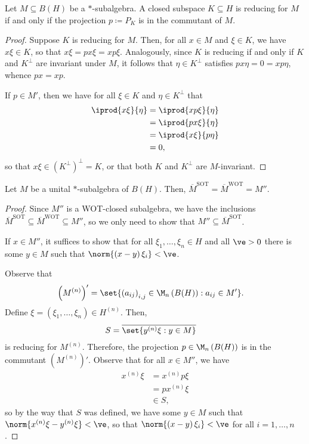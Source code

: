\documentclass[10pt]{mypackage}
\renewcommand{\coloneq}{\coloneqq}
\begin{document}
\begin{theorem}
  Let $M\subseteq B(H)$ be a $\ast$-subalgebra. A closed subspace $K\subseteq H$ is reducing for $M$ if and only if the projection $p\coloneq P_K$ is in the commutant of $M$.
\end{theorem}
\begin{proof}
  Suppose $K$ is reducing for $M$. Then, for all $x\in M$ and $\xi\in K$, we have $x\xi\in K$, so that $x\xi = px\xi = xp\xi$. Analogously, since $K$ is reducing if and only if $K$ and $K^{\perp}$ are invariant under $M$, it follows that $\eta\in K^{\perp}$ satisfies $px\eta = 0 = xp\eta$, whence $px = xp$.

  If $p\in M'$, then we have for all $\xi\in K$ and $\eta\in K^{\perp}$ that
  \begin{align*}
    \iprod{x\xi}{\eta} &= \iprod{xp\xi}{\eta}\\
                       &= \iprod{px\xi}{\eta}\\
                       &= \iprod{x\xi}{p\eta}\\
                       &= 0,
  \end{align*}
  so that $x\xi\in \left( K^{\perp} \right)^{\perp} = K$, or that both $K$ and $K^{\perp}$ are $M$-invariant.
\end{proof}
\begin{theorem}
  Let $M$ be a unital $\ast$-subalgebra of $B(H)$. Then, $ \overline{M}^{\operatorname{SOT}} = \overline{M}^{\operatorname{WOT}} = M'' $.
\end{theorem}
\begin{proof}
  Since $M''$ is a WOT-closed subalgebra, we have the inclusions $ \overline{M}^{\operatorname{SOT}}\subseteq \overline{M}^{\operatorname{WOT}}\subseteq M'' $, so we only need to show that $M''\subseteq \overline{M}^{\operatorname{SOT}}$.

  If $x\in M''$, it suffices to show that for all $\xi_1,\dots,\xi_n\in H$ and all $\ve > 0$ there is some $y\in M$ such that $\norm{\left( x-y \right)\xi_i} < \ve$.

  Observe that
  \begin{align*}
    \left( M^{(n)} \right)' &= \set{\left( a_{ij} \right)_{i,j}\in \M_n\left( B(H) \right) : a_{ij}\in M'}.
  \end{align*}
  Define $\xi = \left( \xi_1,\dots,\xi_n \right)\in H^{(n)}$. Then,
  \begin{align*}
    S &= \overline{\set{y^{(n)}\xi : y\in M}}
  \end{align*}
  is reducing for $M^{(n)}$. Therefore, the projection $p\in \M_n\left( B(H) \right)$ is in the commutant $\left( M^{(n)} \right)'$. Observe that for all $x\in M''$, we have
  \begin{align*}
    x^{(n)} \xi &= x^{(n)}p\xi\\
                &= px^{(n)}\xi\\
                &\in S,
  \end{align*}
  so by the way that $S$ was defined, we have some $y\in M$ such that $\norm{x^{(n)}\xi - y^{(n)}\xi} < \ve$, so that $\norm{\left( x-y \right)\xi_i} < \ve$ for all $i=1,\dots,n$.
\end{proof}
\end{document}
